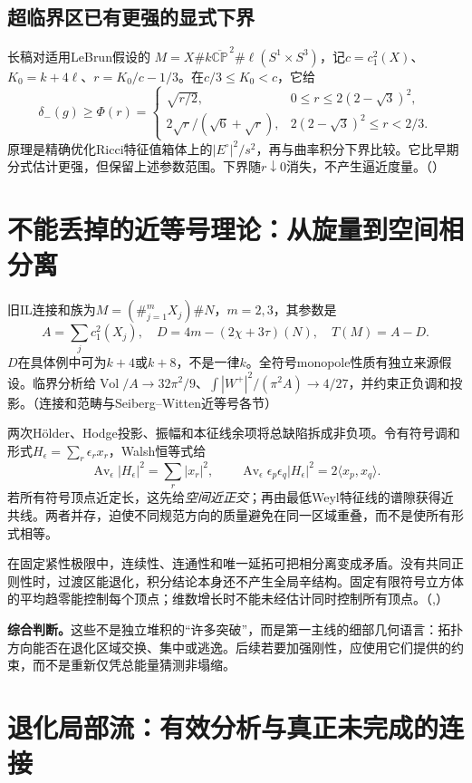 \documentclass[UTF8,fontset=fandol,zihao=-4]{ctexart}
\theoremstyle{research}
\DeclareMathOperator{\Vol}{Vol}
\newcommand{\CP}{\mathbb{CP}}
\numberwithin{equation}{section}
\begin{document}
\subsection{超临界区已有更强的显式下界}
长稿对适用LeBrun假设的
$M=X\#k\overline{\CP}^{\,2}\#\ell(S^1\times S^3)$，记$c=c_1^2(X)$、$K_0=k+4\ell$、$r=K_0/c-1/3$。在$c/3\le K_0<c$，它给
\[
\delta_-(g)\ge\Phi(r)=
\begin{cases}
\sqrt{r/2},&0\le r\le2(2-\sqrt3)^2,\\
2\sqrt r/(\sqrt6+\sqrt r),&2(2-\sqrt3)^2\le r<2/3.
\end{cases}
\]
原理是精确优化Ricci特征值箱体上的$|E^\circ|^2/s^2$，再与曲率积分下界比较。它比早期分式估计更强，但保留上述参数范围。下界随$r\downarrow0$消失，不产生逼近度量。\cite{L}（）

\section{不能丢掉的近等号理论：从旋量到空间相分离}
旧IL连接和族为$M=(\#_{j=1}^mX_j)\#N$，$m=2,3$，其参数是
\[
A=\sum_jc_1^2(X_j),\quad D=4m-(2\chi+3\tau)(N),\quad T(M)=A-D.
\]
$D$在具体例中可为$k+4$或$k+8$，不是一律$k$。全符号monopole性质有独立来源假设。临界分析给$\Vol/A\to32\pi^2/9$、$\int|W^+|^2/(\pi^2A)\to4/27$，并约束正负调和投影。\cite{R}（连接和范畴与Seiberg--Witten近等号各节）

两次Hölder、Hodge投影、振幅和本征线余项将总缺陷拆成非负项。令有符号调和形式$H_\epsilon=\sum_r\epsilon_rx_r$，Walsh恒等式给
\[
\operatorname{Av}_\epsilon|H_\epsilon|^2=\sum_r|x_r|^2,\qquad
\operatorname{Av}_\epsilon\epsilon_p\epsilon_q|H_\epsilon|^2=2\langle x_p,x_q\rangle.
\]
若所有符号顶点近定长，这先给\emph{空间近正交}；再由最低Weyl特征线的谱隙获得近共线。两者并存，迫使不同规范方向的质量避免在同一区域重叠，而不是使所有形式相等。

在固定紧性极限中，连续性、连通性和唯一延拓可把相分离变成矛盾。没有共同正则性时，过渡区能退化，积分结论本身还不产生全局辛结构。固定有限符号立方体的平均趋零能控制每个顶点；维数增长时不能未经估计同时控制所有顶点。\cite{R}（,）

\textbf{综合判断。}这些不是独立堆积的“许多突破”，而是第一主线的细部几何语言：拓扑方向能否在退化区域交换、集中或逃逸。后续若要加强刚性，应使用它们提供的约束，而不是重新仅凭总能量猜测非塌缩。

\section{退化局部流：有效分析与真正未完成的连接}
\end{document}

